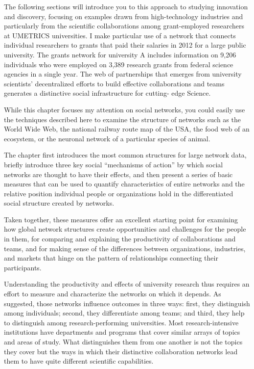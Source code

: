 \documentclass[]{krantz}
\begin{document}
The following sections will introduce you to this approach to studying
innovation and discovery, focusing on examples drawn from
high-technology industries and particularly from the scientific
collaborations among grant-employed researchers at UMETRICS
universities. I make particular use of a network that connects
individual researchers to grants that paid their salaries in 2012 for a
large public university. The grants network for university A includes
information on 9,206 individuals who were employed on 3,389 research
grants from federal science agencies in a single year. The web of
partnerships that emerges from university scientists' decentralized
efforts to build effective collaborations and teams generates a
distinctive social infrastructure for cutting- edge Science.

While this chapter focuses my attention on social networks, you could
easily use the techniques described here to examine the structure of
networks such as the World Wide Web, the national railway route map of
the USA, the food web of an ecosystem, or the neuronal network of a
particular species of animal.

The chapter first introduces the most common structures for large
network data, briefly introduce three key social ``mechanisms of
action'' by which social networks are thought to have their effects, and
then present a series of basic measures that can be used to quantify
characteristics of entire networks and the relative position individual
people or organizations hold in the differentiated social structure
created by networks.

Taken together, these measures offer an excellent starting point for
examining how global network structures create opportunities and
challenges for the people in them, for comparing and explaining the
productivity of collaborations and teams, and for making sense of the
differences between organizations, industries, and markets that hinge on
the pattern of relationships connecting their participants.

\enlargethispage{12pt} Understanding the productivity and effects of
university research thus requires an effort to measure and characterize
the networks on which it depends. As suggested, those networks influence
outcomes in three ways: first, they distinguish among individuals;
second, they differentiate among teams; and third, they help to
distinguish among research-performing universities. Most
research-intensive institutions have departments and programs that cover
similar arrays of topics and areas of study. What distinguishes them
from one another is not the topics they cover but the ways in which
their distinctive collaboration networks lead them to have quite
different scientific capabilities.
\end{document}
